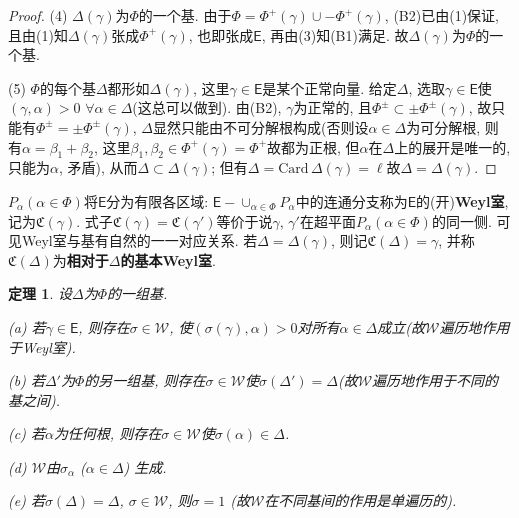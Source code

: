 \documentclass{ctexart}%
\newtheorem{theorem}{定理}
\theoremstyle{definition}
\theoremstyle{remark}
\begin{document}
\begin{proof}
(4) $\Delta(\gamma)$为$\Phi$的一个基. 由于$\Phi=\Phi^+(\gamma)\cup -\Phi^+(\gamma)$, (B2)已由(1)保证, 且由(1)知$\Delta(\gamma)$张成$\Phi^+(\gamma)$, 也即张成$\mathsf{E}$, 再由(3)知(B1)满足. 故$\Delta(\gamma)$为$\Phi$的一个基. 

(5)  $\Phi$的每个基$\Delta$都形如$\Delta(\gamma)$, 这里$\gamma\in \mathsf{E}$是某个正常向量. 给定$\Delta$, 选取$\gamma\in\mathsf{E}$使$(\gamma,\alpha)>0$ $\forall \alpha\in \Delta$(这总可以做到). 由(B2), $\gamma$为正常的, 且$\Phi^\pm \subset \pm \Phi^\pm(\gamma)$, 故只能有$\Phi^\pm = \pm \Phi^\pm(\gamma)$, $\Delta$显然只能由不可分解根构成(否则设$\alpha\in\Delta$为可分解根, 则有$\alpha=\beta_1+\beta_2$, 这里$\beta_1,\beta_2\in \Phi^+(\gamma) = \Phi^+$故都为正根, 但$\alpha$在$\Delta$上的展开是唯一的, 只能为$\alpha$, 矛盾), 从而$\Delta\subset \Delta(\gamma)$; 但有$\Delta=\mathrm{Card}\,\Delta(\gamma)=\ell$故$\Delta=\Delta(\gamma)$.
\end{proof}


$P_\alpha(\alpha\in\Phi)$将$\mathsf{E}$分为有限各区域: $\mathsf{E}-\cup_{\alpha \in\Phi} P_\alpha$中的连通分支称为$\mathsf{E}$的(开)\textbf{Weyl室}, 记为$\mathfrak{C}(\gamma)$. 式子$\mathfrak{C}(\gamma)=\mathfrak{C}(\gamma')$等价于说$\gamma$, $\gamma'$在超平面$P_\alpha(\alpha\in\Phi)$的同一侧. 可见Weyl室与基有自然的一一对应关系. 若$\Delta=\Delta(\gamma)$, 则记$\mathfrak{C}(\Delta)=\mathfrak{\gamma}$, 并称$\mathfrak{C}(\Delta)$为\textbf{相对于$\Delta$的基本Weyl室}.


\begin{theorem}\label{10.3}设$\Delta$为$\Phi$的一组基.

(a) 若$\gamma\in\mathsf{E}$, 则存在$\sigma\in\mathscr{W}$, 使$(\sigma(\gamma),\alpha)>0$对所有$\alpha\in \Delta$成立(故$\mathscr{W}$遍历地作用于Weyl室).

(b) 若$\Delta'$为$\Phi$的另一组基, 则存在$\sigma\in\mathscr{W}$使$\sigma(\Delta')=\Delta$(故$\mathscr{W}$遍历地作用于不同的基之间).

(c) 若$\alpha$为任何根, 则存在$\sigma\in\mathscr{W}$使$\sigma(\alpha)\in \Delta$.

(d) $\mathscr{W}$由$\sigma_\alpha$ ($\alpha\in\Delta$) 生成.

(e) 若$\sigma(\Delta)=\Delta$, $\sigma\in \mathscr{W}$, 则$\sigma=1$ (故$\mathscr{W}$在不同基间的作用是单遍历的).
\end{theorem}
\end{document}
